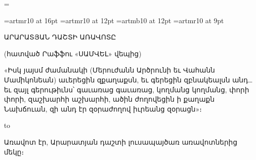 
\magnification=




\font\artmLARGE=artmr10 at 16pt
\font\artmlarge=artmr10 at 12pt
\font\artmbflarge=artmb10 at 12pt
\font\artmsmall=artmr10 at 9pt
\hyphenchar{}
\artm

\parskip=5pt

\vglue 20pt

\centerline{\artmLARGE ԱՐԱՐԱՏՅԱՆ ԴԱՇՏԻ ԱՌԱՎՈՏԸ}

\smallskip

\centerline{\artmlarge (հատված {\artmbflarge Րաֆֆու} «ՍԱՄՎԵԼ» վեպից)}

\vskip 60pt

{\leftskip=150pt\artmsmall
%
«Իսկ յայսմ ժամանակի (Մերուժանն Արծրունի եւ Վահանն Մամիկոնեան) աւերեցին
զքաղաքսն, եւ գերեցին զբնակեալսն անդ… եւ զայլ գերութիւնս՝ գաւառաց գաւառաց,
կողմանց կող\-մանց, փորի փորի, զաշխարհի աշխարհի, ածին ժողովեցին ի քաղաքն
Նախճուան, զի անդ էր զօրաժողով իւրեանց զօրացն»։
%
\par}

\bigskip

\hbox to 

\vskip 40pt

Առավոտ էր, Արարատյան դաշտի լուսապայծառ առավոտներից մեկը։

